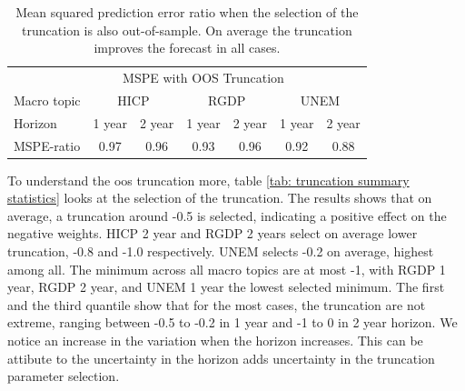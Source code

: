 \documentclass[]{article}
\begin{document}
\begin{table}[!h]
\centering
\caption{Mean squared prediction error ratio when the selection of the truncation is also out-of-sample. On average the truncation improves the forecast in all cases.}
\label{tab: oos mspe}
\begin{tabular}{lcccccc}
\hline
&\multicolumn{5}{c}{MSPE with OOS Truncation}\\
\cmidrule{2-7}
Macro topic & \multicolumn{2}{c}{HICP} & \multicolumn{2}{c}{RGDP} & \multicolumn{2}{c}{UNEM} \\
\cmidrule{2-3} \cmidrule{4-5}\cmidrule{6-7}
Horizon     & 1 year & 2 year & 1 year & 2 year & 1 year & 2 year \\ 
\cmidrule{2-2} \cmidrule{3-3} \cmidrule{4-4} \cmidrule{5-5} \cmidrule{6-6} \cmidrule{7-7}
MSPE-ratio  & 0.97   & 0.96   & 0.93   & 0.96   & 0.92   & 0.88   \\ 
\hline
\end{tabular}
\end{table}

To understand the oos truncation more, table
\ref{tab: truncation summary statistics} looks at the selection of the
truncation. The results shows that on average, a truncation around -0.5
is selected, indicating a positive effect on the negative weights. HICP
2 year and RGDP 2 years select on average lower truncation, -0.8 and
-1.0 respectively. UNEM selects -0.2 on average, highest among all. The
minimum across all macro topics are at most -1, with RGDP 1 year, RGDP 2
year, and UNEM 1 year the lowest selected minimum. The first and the
third quantile show that for the most cases, the truncation are not
extreme, ranging between -0.5 to -0.2 in 1 year and -1 to 0 in 2 year
horizon. We notice an increase in the variation when the horizon
increases. This can be attibute to the uncertainty in the horizon adds
uncertainty in the truncation parameter selection.
\end{document}
